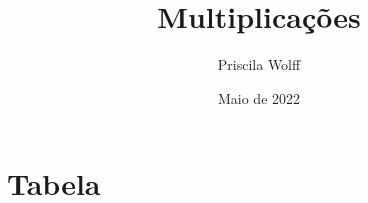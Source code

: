\documentclass[a4paper]{article}
\title{Multiplicações}
\author{Priscila Wolff}
\date{Maio de 2022}
\begin{document}
    \maketitle

    \section{Tabela}

        
\end{document}
